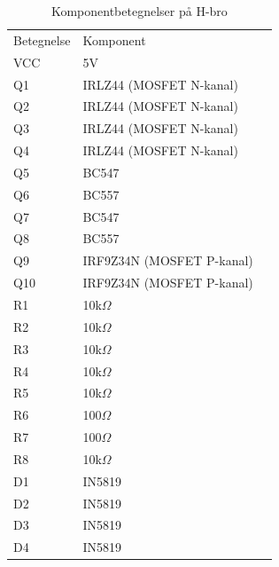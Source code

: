 \begin{table}[H]
	\centering
	\begin{tabular}{|l|l|l}
		\cline{1-2}
		Betegnelse 	& Komponent 	          	 &  \\ \cline{1-2}
		VCC        	& 5V                         &  \\ \cline{1-2}
		Q1   		& IRLZ44 (MOSFET N-kanal)   &  \\ \cline{1-2}
		Q2   		& IRLZ44 (MOSFET N-kanal)   &  \\ \cline{1-2}
		Q3   		& IRLZ44 (MOSFET N-kanal)   &  \\ \cline{1-2}
		Q4   		& IRLZ44 (MOSFET N-kanal)   &  \\ \cline{1-2}
		Q5   		& BC547                      &  \\ \cline{1-2}
		Q6   		& BC557                      &  \\ \cline{1-2}
		Q7   		& BC547                      &  \\ \cline{1-2}
		Q8   		& BC557                      &  \\ \cline{1-2}
		Q9   		& IRF9Z34N (MOSFET P-kanal) &  \\ \cline{1-2}
		Q10  		& IRF9Z34N (MOSFET P-kanal) &  \\ \cline{1-2}
		R1   		& 10k$\Omega$                &  \\ \cline{1-2}
		R2   		& 10k$\Omega$                &  \\ \cline{1-2}
		R3   		& 10k$\Omega$                &  \\ \cline{1-2}
		R4   		& 10k$\Omega$                &  \\ \cline{1-2}
		R5   		& 10k$\Omega$                &  \\ \cline{1-2}
		R6   		& 100$\Omega$                &  \\ \cline{1-2}
		R7   		& 100$\Omega$                &  \\ \cline{1-2}
		R8   		& 10k$\Omega$                &  \\ \cline{1-2}
		D1   		& IN5819						&  \\ \cline{1-2}
		D2   		& IN5819						&  \\ \cline{1-2}
		D3   		& IN5819						&  \\ \cline{1-2}
		D4   		& IN5819		              &  \\ \cline{1-2}
	\end{tabular}
	\caption{Komponentbetegnelser på H-bro}
	\label{hbrotabel}
\end{table}

